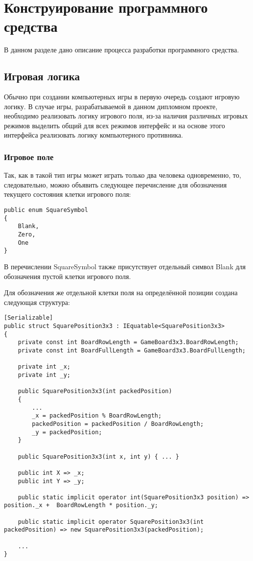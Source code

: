 \section{Конструирование программного средства}

В данном разделе дано описание процесса разработки программного средства.


\subsection{Игровая логика}

Обычно при создании компьютерных игры в первую очередь создают игровую логику. В случае игры, разрабатываемой в данном дипломном проекте, необходимо реализовать логику игрового поля, из-за наличия различных игровых режимов выделить общий для всех режимов интерфейс и на основе этого интерфейса реализовать логику компьютерного противника.


\subsubsection{Игровое поле}

Так, как в такой тип игры может играть только два человека одновременно, то, следовательно, можно объявить следующее перечисление для обозначения текущего состояния клетки игрового поля:

\begin{lstlisting}[caption={Перечисление для обозначения клетки поля}]
public enum SquareSymbol
{
    Blank,
    Zero,
    One
}
\end{lstlisting}

В перечислении SquareSymbol также присутствует отдельный символ Blank для обозначения пустой клетки игрового поля.

Для обозначения же отдельной клетки поля на определённой позиции создана следующая структура:

\begin{lstlisting}[caption={Структура для обозначения позиции клетки поля}, label=Listing:Development:SquarePosition]
[Serializable]
public struct SquarePosition3x3 : IEquatable<SquarePosition3x3>
{
    private const int BoardRowLength = GameBoard3x3.BoardRowLength;
    private const int BoardFullLength = GameBoard3x3.BoardFullLength;

    private int _x;
    private int _y;

    public SquarePosition3x3(int packedPosition)
    {
        ...
        _x = packedPosition % BoardRowLength;
        packedPosition = packedPosition / BoardRowLength;
        _y = packedPosition;
    }

    public SquarePosition3x3(int x, int y) { ... }

    public int X => _x;
    public int Y => _y;

    public static implicit operator int(SquarePosition3x3 position) => position._x +  BoardRowLength * position._y;

    public static implicit operator SquarePosition3x3(int packedPosition) => new SquarePosition3x3(packedPosition);

    ...
}
\end{lstlisting}


